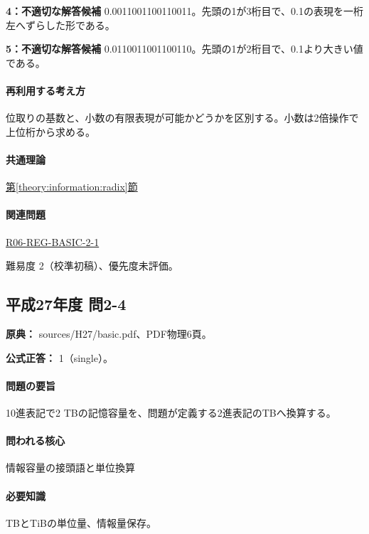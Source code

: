\noindent\textbf{4：不適切な解答候補} 0.0011001100110011。先頭の1が3桁目で、0.1の表現を一桁左へずらした形である。\par

\noindent\textbf{5：不適切な解答候補} 0.0110011001100110。先頭の1が2桁目で、0.1より大きい値である。\par

\paragraph{再利用する考え方} 位取りの基数と、小数の有限表現が可能かどうかを区別する。小数は2倍操作で上位桁から求める。

\paragraph{共通理論} \hyperref[theory:information:radix]{第\ref*{theory:information:radix}節}

\paragraph{関連問題} \hyperref[q:r06-reg-basic-2-1]{R06-REG-BASIC-2-1}

\par 難易度 2（校準初稿）、優先度未評価。

\subsection{平成27年度 問2-4}
\label{q:h27-reg-basic-2-4}

\noindent\textbf{原典：} sources/H27/basic.pdf、PDF物理6頁。

\textbf{公式正答：} 1（single）。

\paragraph{問題の要旨} 10進表記で2 TBの記憶容量を、問題が定義する2進表記のTBへ換算する。

\paragraph{問われる核心} 情報容量の接頭語と単位換算

\paragraph{必要知識} TBとTiBの単位量、情報量保存。

